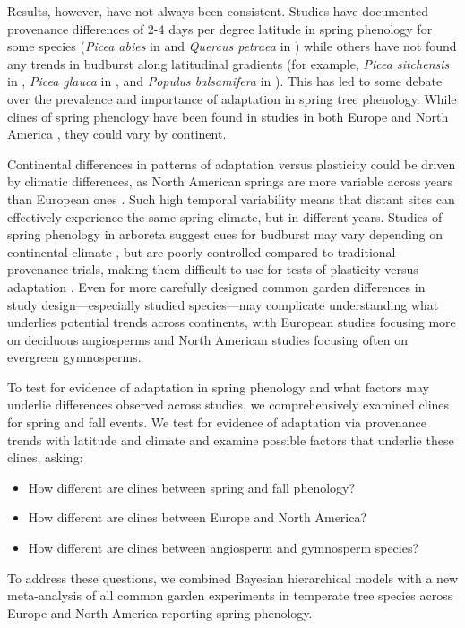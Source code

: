\documentclass{article}
\begin{document}
Results, however, have not always been consistent. Studies have documented provenance differences of 2-4 days per degree latitude in spring phenology for some species (\emph{Picea abies} in \citealp{sog08} and \emph{Quercus petraea} in \citealp{deans96}) while others have not found any trends in budburst along latitudinal gradients (for example, \emph{Picea sitchensis} in \citealp{mimura07}, \emph{Picea glauca} in \citealp{Li97}, and \emph{Populus balsamifera} in \citealp{farmer93}). This has led to some debate over the prevalence and importance of adaptation in spring tree phenology. While clines of spring phenology have been found in studies in both Europe \citep{sog08,deans96,von95} and North America \citep{rossi15, soo13, hannerz99}, they could vary by continent. 

Continental differences in patterns of adaptation versus plasticity could be driven by climatic differences, as North American springs are more variable across years than European ones \citep{tward21,zohner2017,schwartz00}. Such high temporal variability means that distant sites can effectively experience the same spring climate, but in different years. Studies of spring phenology in arboreta suggest cues for budburst may vary depending on continental climate \citep{zohner2017}, but are poorly controlled compared to traditional provenance trials, making them difficult to use for tests of plasticity versus adaptation \citep{gauzere2020}. Even for more carefully designed common garden differences in study design---especially studied species---may complicate understanding what underlies potential trends across continents, with European studies focusing more on deciduous angiosperms and North American studies focusing often on evergreen gymnosperms.  

To test for evidence of adaptation in spring phenology and what factors may underlie differences observed across studies, we comprehensively examined clines for spring and fall events. We test for evidence of adaptation via provenance trends with latitude and climate and examine possible factors that underlie these clines, asking:
\begin{itemize}
\item How different are clines between spring and fall phenology? 
\item How different are clines between Europe and North America?
\item How different are clines between angiosperm and gymnosperm species?
\end{itemize}
To address these questions, we combined Bayesian hierarchical models with a new meta-analysis of all common garden experiments in temperate tree species across Europe and North America reporting spring phenology. 
\end{document}
